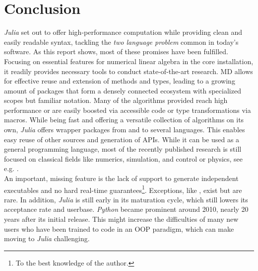 \section{Conclusion}
\label{JM:sec:CONC}

\textit{Julia} set out to offer high-performance computation while providing clean and easily readable syntax, tackling the \textit{two language problem} common 
in today's software. As this report shows, most of these promises have been fulfilled. Focusing on essential features for numerical linear algebra in the core installation, it readily provides necessary 
tools to conduct state-of-the-art research. MD allows for effective reuse and extension of methods and types, leading to a growing amount of 
packages that form a densely connected ecosystem with specialized scopes but familiar notation. 
Many of the algorithms provided reach high performance or are easily boosted via accessible code or type transformations via macros. While being fast and offering a versatile collection of algorithms on its own, \textit{Julia} offers wrapper packages from and to 
several languages. This enables easy reuse of other sources and generation of APIs. 
While it can be used as a general programming language, most of the recently published research is still focused on classical 
fields like numerics, simulation, and control or physics, see e.g. \cite{JMJarlebring2019, JMForetsEtAl2020, JMKalubaEtAl2021}.\\

An important, missing feature is the lack of support to generate independent executables and no hard real-time guarantees\footnote{To the best knowledge of the author.}. Exceptions, like \cite{JMKoolenDeits2019}, exist but are rare.
In addition, \textit{Julia} is still early in its maturation cycle, which still lowers its acceptance rate and userbase. \textit{Python} became prominent around 2010, nearly 20 years after its initial release. 
This might increase the difficulties of many new users who have been trained to code in an OOP paradigm, which can make moving to \textit{Julia} challenging.






